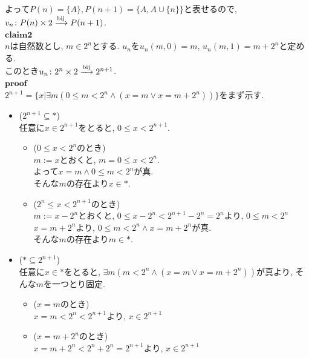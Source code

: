   よって$P(n) = \{A\},P(n+1) = \{A, A \cup \{n\}\}$と表せるので,
  $v_n\colon P(n) \times 2 \xrightarrow{\text{bij}} P(n+1)$.\\
  $\mathbf{claim2}$\\
  $n$は自然数とし,
  $m \in 2^n$とする.
  $u_n$を$u_n(m,0) = m$,
  $u_n(m,1) = m+ 2^n$と定める.\\
  このとき$u_n\colon 2^n \times 2 \xrightarrow{\text{bij}} 2^{n+1}$.\\
  $\mathbf{proof}$\\
  $2^{n+1} = \{x | \exists m (0 \leq m < 2^n \land( x = m \lor  x = m+ 2^n))\}$をまず示す.
  \begin{itemize}
    \item[]\hspace{-0.5cm} ($2^{n+1} \subseteq *$) \\
      任意に$x \in 2^{n+1}$をとると,
      $0 \leq x < 2^{n+1}$.
      \begin{itemize}
        \item[]\hspace{-0.5cm} ($0 \leq x < 2^n$のとき) \\
          $m:= x$とおくと,
          $m = 0 \leq x < 2^n$.\\
          よって$x =m \land 0 \leq m < 2^n$が真.\\
          そんな$m$の存在より$x \in *$.
        \item[]\hspace{-0.5cm} ($2^n \leq x < 2^{n+1}$のとき) \\
          $m:= x - 2^n$とおくと,
          $0 \leq x - 2^n < 2^{n+1} - 2^n = 2^n$より,
          $0 \leq m < 2^n$\\
          $x = m + 2^n$より,
          $0 \leq m < 2^n \land x = m+2^n$が真.\\
          そんな$m$の存在より$m \in *$.
      \end{itemize}
    \item[]\hspace{-0.5cm} ($ * \subseteq2^{n+1}$) \\
      任意に$x \in *$をとると,
      $\exists m (m < 2^n \land( x = m \lor  x = m+ 2^n))$が真より,
      そんな$m$を一つとり固定.
      \begin{itemize}
        \item[]\hspace{-0.5cm} ($x = m$のとき) \\
          $x = m < 2^n < 2^{n+1}$より,
          $x \in 2^{n+1}$
        \item[]\hspace{-0.5cm} ($x = m + 2^n$のとき) \\
          $x = m+ 2^n < 2^n + 2^n = 2^{n+1}$より,
          $x \in 2^{n+1}$
      \end{itemize}
  \end{itemize}
